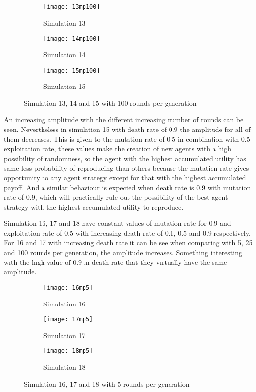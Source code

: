 \begin{figure}[H]       
    \centering
    \begin{subfigure}[b]{0.3\textwidth}
	\centering
	{\texttt{[image: 13mp100]}}   
    	\caption{Simulation 13}
	\label{fig:mpsim13100}
    \end{subfigure}
    \hfill
    \begin{subfigure}[b]{0.3\textwidth}
	\centering
	{\texttt{[image: 14mp100]}}   
    	\caption{Simulation 14}
	\label{fig:mpsim14100}
    \end{subfigure}
    \hfill
    \begin{subfigure}[b]{0.3\textwidth}
	\centering
	{\texttt{[image: 15mp100]}}   
    	\caption{Simulation 15}
	\label{fig:mpsim15100}
    \end{subfigure}
    \caption{Simulation 13, 14 and 15 with 100 rounds per generation}
    \label{mpsim131415simulations100}
\end{figure}

An increasing amplitude with the different increasing number of rounds can be seen. Nevertheless in simulation 15 with death rate of 0.9 the amplitude for all of them decreases. This is given to the mutation rate of 0.5 in combination with 0.5 exploitation rate, these values make the creation of new agents with a high possibility of randomness, so the agent with the highest accumulated utility has same less probability of reproducing than others because the mutation rate gives opportunity to any agent strategy except for that with the highest accumulated payoff. And a similar behaviour is expected when death rate is 0.9 with mutation rate of 0.9, which will practically rule out the possibility of the best agent strategy with the highest accumulated utility to reproduce.

Simulation 16, 17 and 18  have constant values of mutation rate for 0.9 and exploitation rate of 0.5 with increasing death rate of 0.1, 0.5 and 0.9 respectively. For 16 and 17 with increasing death rate it can be see when comparing with 5, 25 and 100 rounds per generation, the amplitude increases. Something interesting with the high value of 0.9 in death rate that they virtually have the same amplitude.

\begin{figure}[H]       
    \centering
    \begin{subfigure}[b]{0.3\textwidth}
	\centering
	{\texttt{[image: 16mp5]}}   
    	\caption{Simulation 16}
	\label{fig:mpsim165}
    \end{subfigure}
    \hfill
    \begin{subfigure}[b]{0.3\textwidth}
	\centering
	{\texttt{[image: 17mp5]}}   
    	\caption{Simulation 17}
	\label{fig:mpsim175}
    \end{subfigure}
    \hfill
    \begin{subfigure}[b]{0.3\textwidth}
	\centering
	{\texttt{[image: 18mp5]}}   
    	\caption{Simulation 18}
	\label{fig:mpsim185}
    \end{subfigure}
    \caption{Simulation 16, 17 and 18 with 5 rounds per generation}
    \label{mpsim161718simulations5}
\end{figure}

